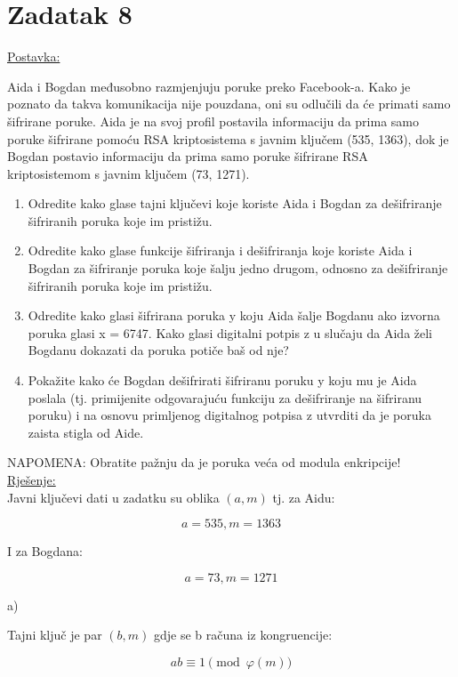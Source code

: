 \documentclass[12pt]{article}
\begin{document}
\section*{Zadatak 8\label{Z8}}

\underline{Postavka:}

Aida i Bogdan međusobno razmjenjuju poruke preko Facebook-a. Kako je poznato da takva komunikacija nije pouzdana, oni su odlučili da će primati samo šifrirane poruke. Aida je na svoj profil postavila informaciju da prima samo poruke šifrirane pomoću RSA kriptosistema s javnim ključem (535, 1363), dok je Bogdan postavio informaciju da prima samo poruke šifrirane RSA kriptosistemom s javnim ključem (73, 1271).\\

\begin{enumerate}  
\item Odredite kako glase tajni ključevi koje koriste Aida i Bogdan za dešifriranje šifriranih poruka koje im pristižu.
\item Odredite kako glase funkcije šifriranja i dešifriranja koje koriste Aida i Bogdan za šifriranje poruka koje šalju jedno drugom, odnosno za dešifriranje šifriranih poruka koje im pristižu.
\item Odredite kako glasi šifrirana poruka y koju Aida šalje Bogdanu ako izvorna poruka glasi x = 6747. Kako glasi digitalni potpis z u slučaju da Aida želi Bogdanu dokazati da poruka potiče baš od nje?
\item Pokažite kako će Bogdan dešifrirati šifriranu poruku y koju mu je Aida poslala (tj. primijenite odgovarajuću funkciju za dešifriranje na šifriranu poruku) i na osnovu primljenog digitalnog potpisa z utvrditi da je poruka zaista stigla od Aide.
\end{enumerate}


NAPOMENA: Obratite pažnju da je poruka veća od modula enkripcije!\\

\underline{Rješenje:}\\

Javni ključevi dati u zadatku su oblika $(a, m)$ tj. za Aidu:

$$a = 535, m = 1363$$

I za Bogdana:

$$a = 73, m = 1271$$

a)

Tajni ključ je par $(b, m)$ gdje se b računa iz kongruencije:

$$ab \equiv 1 \pmod{\varphi (m)}$$\vspace{1mm}
\end{document}
